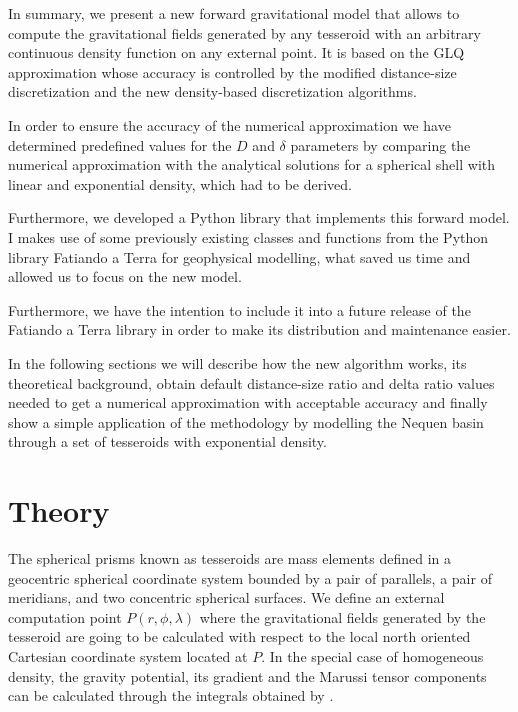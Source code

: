\documentclass[extra]{gji}
\begin{document}
In summary, we present a new forward gravitational model that allows to 
compute the gravitational fields generated by any tesseroid with an 
arbitrary continuous density function on any external point.
It is based on the GLQ approximation whose accuracy is controlled by 
the modified distance-size discretization \citep{Uieda2016} 
and the new density-based discretization algorithms.

In order to ensure the accuracy of the numerical approximation we have 
determined predefined values for the $D$ and $\delta$ parameters by 
comparing the numerical approximation with the analytical solutions for 
a spherical shell with linear and exponential density, which had to be 
derived.

Furthermore, we developed a Python library that implements this forward 
model.
I makes use of some previously existing classes and functions 
from the Python library Fatiando a Terra for geophysical modelling, 
what saved us time and allowed us to focus on the new model.

Furthermore, we have the intention to include it into a future release 
of the Fatiando a Terra library in order to make its distribution and 
maintenance easier.

In the following sections we will describe how the new algorithm works, its 
theoretical background, obtain default distance-size ratio and delta ratio 
values needed to get a numerical approximation with acceptable accuracy and 
finally show a simple application of the methodology by modelling the Nequen 
basin through a set of tesseroids with exponential density.


\section{Theory}

The spherical prisms known as tesseroids are mass elements defined in a 
geocentric spherical coordinate system bounded by a pair of parallels, 
a pair of  meridians, and two concentric spherical surfaces.
We define an external computation point $P(r, \phi, \lambda)$ where the 
gravitational fields generated by the tesseroid are going to be calculated 
with respect to the local north oriented Cartesian coordinate system 
located at $P$.
In the special case of homogeneous density, the gravity potential, its 
gradient and the Marussi tensor components can be calculated through 
the integrals obtained by \citet{Grombein2013} \citep[for same notation 
as the one we will use, see][]{Uieda2016}.
\end{document}
